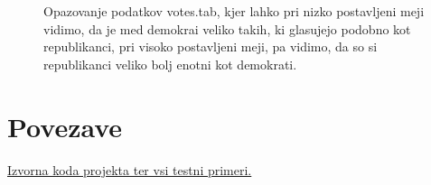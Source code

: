 \documentclass[a4paper]{article}
\begin{document}
	\begin{figure}[H]
	\begin{center}
	\end{center}
	\caption{Opazovanje podatkov votes.tab, kjer lahko pri nizko postavljeni meji vidimo, da je med demokrai veliko takih, ki glasujejo podobno kot republikanci, pri visoko postavljeni meji, pa vidimo, da so si republikanci veliko bolj enotni kot demokrati.}
	\label{f-votes}
	\end{figure}

\section{Povezave}
	\href{https://github.com/hamaxx/Universe-Classification}{Izvorna koda projekta ter vsi testni primeri.}
\end{document}
